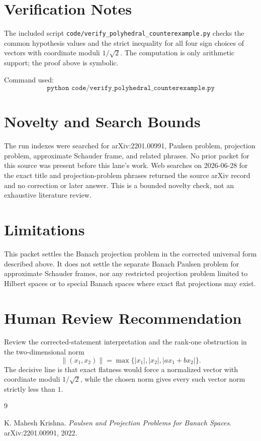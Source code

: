 \documentclass[11pt]{article}
\begin{document}
\section*{Verification Notes}

The included script \texttt{code/verify\_polyhedral\_counterexample.py}
checks the common hypothesis values and the strict inequality for all four
sign choices of vectors with coordinate moduli \(1/\sqrt2\).  The computation
is only arithmetic support; the proof above is symbolic.

Command used:
\[
\texttt{python code/verify\_polyhedral\_counterexample.py}
\]

\section*{Novelty and Search Bounds}

The run indexes were searched for arXiv:2201.00991, Paulsen problem,
projection problem, approximate Schauder frame, and related phrases.  No
prior packet for this source was present before this lane's work.  Web
searches on 2026-06-28 for the exact title and projection-problem phrases
returned the source arXiv record and no correction or later answer.  This is
a bounded novelty check, not an exhaustive literature review.

\section*{Limitations}

This packet settles the Banach projection problem in the corrected universal
form described above.  It does not settle the separate Banach Paulsen problem
for approximate Schauder frames, nor any restricted projection problem limited
to Hilbert spaces or to special Banach spaces where exact flat projections may
exist.

\section*{Human Review Recommendation}

Review the corrected-statement interpretation and the rank-one obstruction in
the two-dimensional norm
\[
\|(x_1,x_2)\|=\max\{|x_1|,|x_2|,|a x_1+b x_2|\}.
\]
The decisive line is that exact flatness would force a normalized vector with
coordinate moduli \(1/\sqrt2\), while the chosen norm gives every such vector
norm strictly less than \(1\).

\begin{thebibliography}{9}

K. Mahesh Krishna.
\newblock \emph{Paulsen and Projection Problems for Banach Spaces}.
\newblock arXiv:2201.00991, 2022.

\end{thebibliography}
\end{document}
